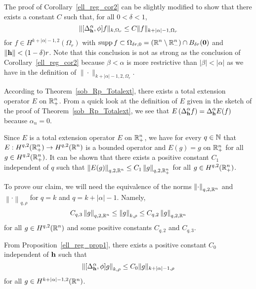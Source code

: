 \begin{rmk}
The proof of Corollary~\ref{ell_reg_cor2} can be slightly modified
to show that there exists a constant $C$ such that, for all $0 < \delta <1$, 
\[
  \| [\Delta^\alpha_{\mathbf{h}}, \phi] f \|_{k,\Omega_r}
\leq C \| f \|_{k+|\alpha|-1,\Omega_r}
\]
for $f \in H^{k+|\alpha|-1,2}(\Omega_r)$ with
$\displaystyle \operatorname{supp} f \subset \Omega_{\delta r,0}
= (\mathbb{R}^n \setminus \mathbb{R}^n_-) \cap B_{\delta r}(\mathbf{0})$ and
$\|\mathbf{h}\|<(1-\delta)r$.
Note that this conclusion is not as strong as the conclusion of
Corollary~\ref{ell_reg_cor2} because $\beta < \alpha$ is more
restrictive than $|\beta| < |\alpha|$ as we have in the definition of 
$\displaystyle \| \cdot \|_{k+|\alpha|-1,2,\Omega_r}$.

According to Theorem~\ref{sob_Rp_Totalext}, there exists a total
extension operator $E$ on $\displaystyle \mathbb{R}^n_+ $.  From a quick look
at the definition of $E$ given in the sketch of the proof of
Theorem~\ref{sob_Rp_Totalext}, we see
that $\displaystyle E\left( \Delta^\alpha_{\mathbf{h}} f\right) =
\Delta^\alpha_{\mathbf{h}} E(f)$ because $\alpha_n=0$.

Since $E$ is a total extension operator $E$ on $\displaystyle \mathbb{R}^n_+ $, we
have for every $q \in \mathbb{N}$ that
$\displaystyle E:H^{q,2}(\mathbb{R}^n_+) \to H^{q,2}(\mathbb{R}^n)$ is a
bounded operator and $E(g) = g$ on $\mathbb{R}^n_+$ for all
$\displaystyle g \in H^{q,2}(\mathbb{R}^n_+)$.  It can be
shown that there exists a positive constant $C_1$ independent of $q$ such that
$\displaystyle \left\| E(g) \right\|_{q,2,\mathbb{R}^n} \leq C_1
\left\| g \right\|_{q,2,\mathbb{R}^n_+}$ for all $\displaystyle g \in H^{q,2}(\mathbb{R}^n_+)$.

To prove our claim, we will need the equivalence of the norms
$\displaystyle \left\|\cdot\right\|_{q,2,\mathbb{R}^n}$ and 
$\displaystyle \left\|\cdot\right\|_{q,\rho}$ for $q=k$ and $q=k+|\alpha|-1$.
Namely,
\[
C_{q,3} \left\|g \right\|_{q,2,\mathbb{R}^n} \leq \left\|g \right\|_{k,\rho}
\leq C_{q,2} \left\|g \right\|_{q,2,\mathbb{R}^n}
\]
for all $\displaystyle g \in H^{q,2}(\mathbb{R}^n)$ and some positive
constants $C_{q,2}$ and $C_{q,3}$.

From Proposition~\ref{ell_reg_prop1}, there exists a positive constant $C_0$
independent of $\mathbf{h}$ such that
\[
\left\| [\Delta^\alpha_{\mathbf{h}}, \phi] g \right\|_{k,\rho}
\leq C_0 \| g \|_{k+|\alpha|-1,\rho}
\]
for all $g \in H^{k+|\alpha|-1,2}(\mathbb{R}^n)$.


\end{rmk}
